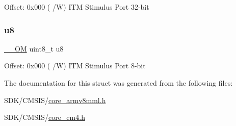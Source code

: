 Offset\+: 0x000 ( /W) I\+TM Stimulus Port 32-\/bit \mbox{\label{struct_i_t_m___type_a4c0550e859d614c607bd4b575f05425c}} 
\subsubsection{\texorpdfstring{u8}{u8}}
{\footnotesize\ttfamily \mbox{\hyperlink{core__cm4_8h_a0ea2009ed8fd9ef35b48708280fdb758}{\+\_\+\+\_\+\+OM}} uint8\+\_\+t u8}

Offset\+: 0x000 ( /W) I\+TM Stimulus Port 8-\/bit 

The documentation for this struct was generated from the following files\+:\begin{DoxyCompactItemize}
\item 
S\+D\+K/\+C\+M\+S\+I\+S/\mbox{\hyperlink{core__armv8mml_8h}{core\+\_\+armv8mml.\+h}}\item 
S\+D\+K/\+C\+M\+S\+I\+S/\mbox{\hyperlink{core__cm4_8h}{core\+\_\+cm4.\+h}}\end{DoxyCompactItemize}
